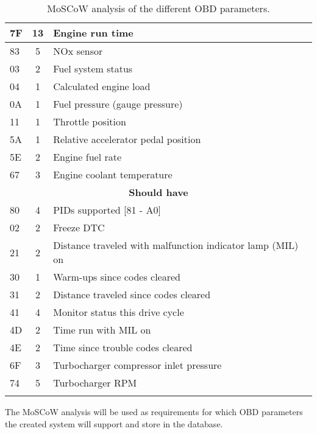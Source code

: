 \begin{longtable}{|l|c|l|}
    7F & 13 & Engine run time                                               \\ \hline
    83 & 5  & NOx sensor                                                    \\ \hline
    03 & 2  & Fuel system status                                            \\ \hline
    04 & 1  & Calculated engine load                                        \\ \hline
    0A & 1  & Fuel pressure (gauge pressure)                                \\ \hline
    11 & 1  & Throttle position                                             \\ \hline
    5A & 1  & Relative accelerator pedal position                           \\ \hline
    5E & 2  & Engine fuel rate                                              \\ \hline
    67 & 3  & Engine coolant temperature                                    \\ \hline
    \multicolumn{3}{|c|}{\textbf{Should have}}                              \\ \hline
    80 & 4  & PIDs supported [81 - A0]                                      \\ \hline
    02 & 2  & Freeze DTC                                                    \\ \hline
    21 & 2  & Distance traveled with malfunction indicator lamp (MIL) on    \\ \hline
    30 & 1  & Warm-ups since codes cleared                                  \\ \hline
    31 & 2  & Distance traveled since codes cleared                         \\ \hline
    41 & 4  & Monitor status this drive cycle                               \\ \hline
    4D & 2  & Time run with MIL on                                          \\ \hline
    4E & 2  & Time since trouble codes cleared                              \\ \hline
    6F & 3  & Turbocharger compressor inlet pressure                        \\ \hline
    74 & 5  & Turbocharger RPM                                              \\ \hline
    \caption{MoSCoW analysis of the different OBD parameters.}
    \label{tab:moscow_pids}
\end{longtable}

The MoSCoW analysis will be used as requirements for which \ac{OBD} parameters the created system will support and store in the database.
